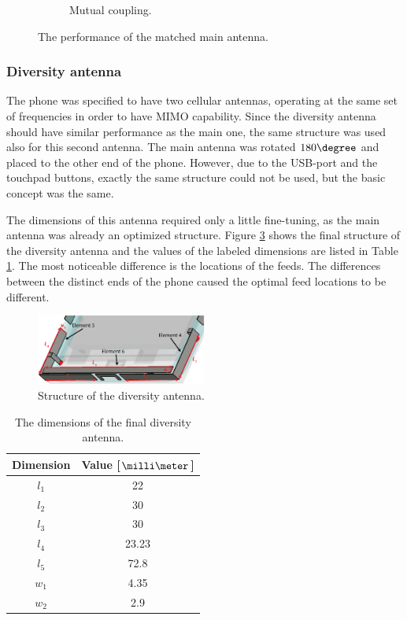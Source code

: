 \begin{figure}[H]
\begin{subfigure}[b]{0.49\textwidth}
        \caption{Mutual coupling.}
        \label{fig:main_final_res_match_coup}
    \end{subfigure}
    \caption{The performance of the matched main antenna.}
\end{figure}


\subsubsection{Diversity antenna}
\label{sec:diversity}
The phone was specified to have two cellular antennas, operating at the same set of frequencies in order to have MIMO capability. Since the diversity antenna should have similar performance as the main one, the same structure was used also for this second antenna. The main antenna was rotated $180\degree$ and placed to the other end of the phone. However, due to the USB-port and the touchpad buttons, exactly the same structure could not be used, but the basic concept was the same.

The dimensions of this antenna required only a little fine-tuning, as the main antenna was already an optimized structure. Figure \ref{fig:div_final} shows the final structure of the diversity antenna and the values of the labeled dimensions are listed in Table \ref{tab:div_final}. The most noticeable difference is the locations of the feeds. The differences between the distinct ends of the phone caused the optimal feed locations to be different. 
\begin{figure}[H]
    \centering
    \includegraphics[width=0.5\textwidth]{img/diversity_final.eps}
    \caption{Structure of the diversity antenna.}
    \label{fig:div_final}
\end{figure}
\begin{table}[H]
    \centering
    \caption{The dimensions of the final diversity antenna.}
    \label{tab:div_final}
    \begin{tabular}{|c|c|}
        \hline
        \textbf{Dimension} & \textbf{Value [$\milli\meter$]}\\
        \hline
        $l_1$ & 22 \\
        \hline
        $l_2$ & 30\\
        \hline
        $l_3$ & 30 \\
        \hline
        $l_4$ & 23.23 \\
        \hline
        $l_5$ & 72.8 \\
        \hline
        $w_1$ & 4.35\\
        \hline
        $w_2$ & 2.9\\
        \hline
    \end{tabular}
\end{table}

